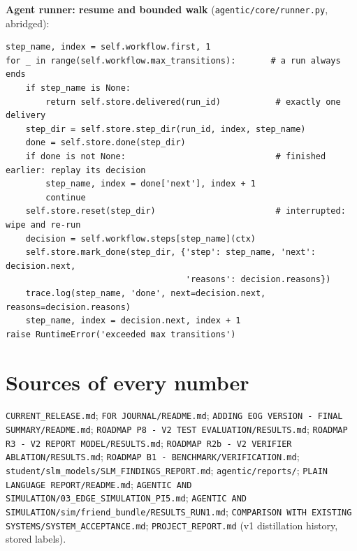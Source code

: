 \textbf{Agent runner: resume and bounded walk} (\texttt{agentic/core/runner.py}, abridged):
\begin{lstlisting}
step_name, index = self.workflow.first, 1
for _ in range(self.workflow.max_transitions):       # a run always ends
    if step_name is None:
        return self.store.delivered(run_id)           # exactly one delivery
    step_dir = self.store.step_dir(run_id, index, step_name)
    done = self.store.done(step_dir)
    if done is not None:                              # finished earlier: replay its decision
        step_name, index = done['next'], index + 1
        continue
    self.store.reset(step_dir)                        # interrupted: wipe and re-run
    decision = self.workflow.steps[step_name](ctx)
    self.store.mark_done(step_dir, {'step': step_name, 'next': decision.next,
                                    'reasons': decision.reasons})
    trace.log(step_name, 'done', next=decision.next, reasons=decision.reasons)
    step_name, index = decision.next, index + 1
raise RuntimeError('exceeded max transitions')
\end{lstlisting}

\section{Sources of every number}

\texttt{CURRENT\_RELEASE.md}; \texttt{FOR JOURNAL/README.md}; \texttt{ADDING EOG VERSION - FINAL SUMMARY/README.md};
\texttt{ROADMAP P8 - V2 TEST EVALUATION/RESULTS.md}; \texttt{ROADMAP R3 - V2 REPORT MODEL/RESULTS.md};
\texttt{ROADMAP R2b - V2 VERIFIER ABLATION/RESULTS.md}; \texttt{ROADMAP B1 - BENCHMARK/VERIFICATION.md};
\texttt{student/slm\_models/SLM\_FINDINGS\_REPORT.md}; \texttt{agentic/reports/}; \texttt{PLAIN LANGUAGE REPORT/README.md};
\texttt{AGENTIC AND SIMULATION/03\_EDGE\_SIMULATION\_PI5.md}; \texttt{AGENTIC AND SIMULATION/sim/friend\_bundle/RESULTS\_RUN1.md};
\texttt{COMPARISON WITH EXISTING SYSTEMS/SYSTEM\_ACCEPTANCE.md}; \texttt{PROJECT\_REPORT.md} (v1 distillation history,
stored labels).
